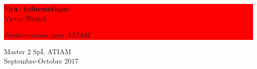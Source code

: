 \colorbox{Red}{
	\parbox[t]{1.0\linewidth}{
		\centering \fontsize{35pt}{80pt}\selectfont %
		\vspace*{0.7cm} %
		
        
        \hfill \LARGE{\textbf{FpA: Informatique}} \\
 
 		\vspace{10pt}
		\hfill \Large{Victor Wetzel}\par
		\hfill \Large{\textit{Fondamentaux pour ATIAM}}  
		\vspace*{0.7cm} %
	}
}

\vspace{70pt}

\vfill %


{\centering \large 
\hfill Master 2 SpI, ATIAM\\
\hfill Septembre-Octobre 2017\\
}


\clearpage %

